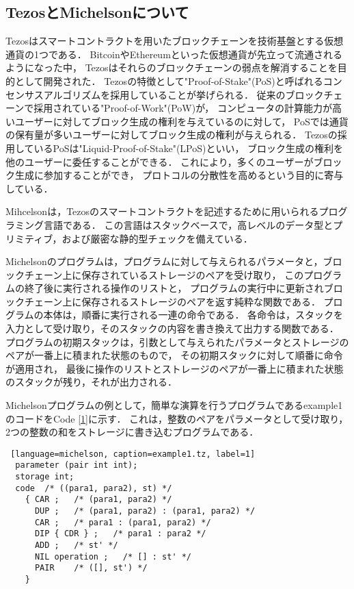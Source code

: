 \documentclass{kuisthesis}
\begin{document}
\subsection{TezosとMichelsonについて}\label{subsec-pre-tezos}
Tezosはスマートコントラクトを用いたブロックチェーンを技術基盤とする仮想通貨の1つである．
BitcoinやEthereumといった仮想通貨が先立って流通されるようになった中，
Tezosはそれらのブロックチェーンの弱点を解消することを目的として開発された．
Tezosの特徴として"Proof-of-Stake"(PoS)と呼ばれるコンセンサスアルゴリズムを採用していることが挙げられる．
従来のブロックチェーンで採用されている"Proof-of-Work"(PoW)が，
コンピュータの計算能力が高いユーザーに対してブロック生成の権利を与えているのに対して，
PoSでは通貨の保有量が多いユーザーに対してブロック生成の権利が与えられる．
Tezosの採用しているPoSは"Liquid-Proof-of-Stake"(LPoS)といい，
ブロック生成の権利を他のユーザーに委任することができる．
これにより，多くのユーザーがブロック生成に参加することができ，
プロトコルの分散性を高めるという目的に寄与している．

Mihcelsonは，Tezosのスマートコントラクトを記述するために用いられるプログラミング言語である．
この言語はスタックベースで，高レベルのデータ型とプリミティブ，および厳密な静的型チェックを備えている．

Michelsonのプログラムは，プログラムに対して与えられるパラメータと，ブロックチェーン上に保存されているストレージのペアを受け取り，
このプログラムの終了後に実行される操作のリストと，
プログラムの実行中に更新されブロックチェーン上に保存されるストレージのペアを返す純粋な関数である．
プログラムの本体は，順番に実行される一連の命令である．
各命令は，スタックを入力として受け取り，そのスタックの内容を書き換えて出力する関数である．
プログラムの初期スタックは，引数として与えられたパラメータとストレージのペアが一番上に積まれた状態のもので，
その初期スタックに対して順番に命令が適用され，
最後に操作のリストとストレージのペアが一番上に積まれた状態のスタックが残り，それが出力される．

Michelsonプログラムの例として，簡単な演算を行うプログラムであるexample1のコードをCode \ref{1}に示す．
これは，整数のペアをパラメータとして受け取り，2つの整数の和をストレージに書き込むプログラムである．
\\
\begin{lstlisting} [language=michelson, caption=example1.tz, label=1]
  parameter (pair int int); 
  storage int;
  code  /* ((para1, para2), st) */
    { CAR ;   /* (para1, para2) */
      DUP ;   /* (para1, para2) : (para1, para2) */
      CAR ;   /* para1 : (para1, para2) */
      DIP { CDR } ;   /* para1 : para2 */
      ADD ;   /* st' */
      NIL operation ;   /* [] : st' */
      PAIR    /* ([], st') */
    }
\end{lstlisting}
\end{document}
